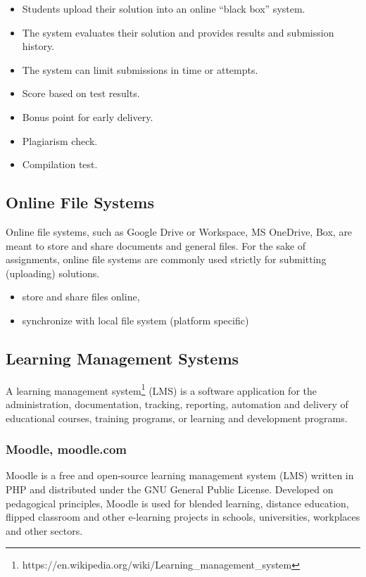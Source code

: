 \begin{itemize}
\item
  {Students upload their solution into an online ``black box'' system.}
\item
  {The system evaluates their solution and provides results and submission history.}
\item
  {The system can limit submissions in time or attempts.}
\item
  {Score based on test results.}
\item
  {Bonus point for early delivery.}
\item
  {Plagiarism check.}
\item
  {Compilation test.}
\end{itemize}

\subsection{Online File Systems}

{Online file systems, such as Google Drive or Workspace, MS OneDrive, Box, are meant to store and share documents and general files. For the sake of assignments, online file systems are commonly used strictly for submitting (uploading) solutions.}

\begin{itemize}
\item
  {store and share files online,}
\item
  {synchronize with local file system (platform specific)}
\end{itemize}

\subsection{Learning Management Systems} \label{ssec:lms}

{A learning management system\footnote{https://en.wikipedia.org/wiki/Learning\_management\_system} (LMS) is a software application for the administration, documentation, tracking, reporting, automation and delivery of educational courses, training programs, or learning and development programs.}

\subsubsection{Moodle, moodle.com}

{Moodle is a free and open-source learning management system (LMS) written in PHP and distributed under the GNU General Public License. Developed on pedagogical principles, Moodle is used for blended learning, distance education, flipped classroom and other e-learning projects in schools, universities, workplaces and other sectors.}

